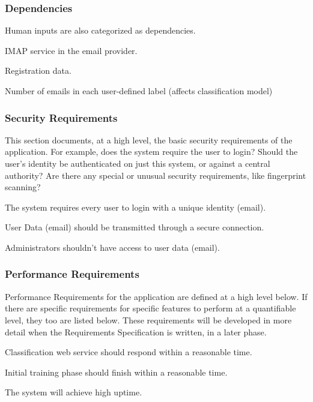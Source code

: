 \subsubsection{Dependencies}
Human inputs are also categorized as dependencies.
\begin{my_enumerate}
  \item IMAP service in the email provider.
  \item Registration data.
  \item Number of emails in each user-defined label (affects classification model)
\end{my_enumerate}


\subsubsection{Security Requirements}
This section documents, at a high level, the basic security requirements of the 
application. For example, does the system require the user to login?  Should the 
user’s identity be authenticated on just this system, or against a central authority?  
Are there any special or unusual security requirements, like fingerprint scanning?

\begin{my_enumerate}
  \item The system requires every user to login with a unique identity (email).
  \item User Data (email) should be transmitted through a secure connection.
  \item Administrators shouldn’t have access to user data (email).
\end{my_enumerate}



\subsubsection{Performance Requirements}
Performance Requirements for the application are defined at a high level below. 
If there are specific requirements for specific features to perform at a quantifiable 
level, they too are listed below. These requirements will be developed in more detail when 
the Requirements Specification is written, in a later phase.

\begin{my_enumerate}
  \item Classification web service should respond within a reasonable time.
  \item Initial training phase should finish within a reasonable time.
  \item The system will achieve high uptime.
\end{my_enumerate}


